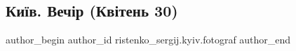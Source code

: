  
 
 
 
 

\subsection{Київ. Вечір (Квітень 30)}
\label{sec:30_04_2023.fb.ristenko_sergij.kyiv.fotograf.1.kyiv_vechir_kviten_30}

\ifcmt
 author_begin
   author_id ristenko_sergij.kyiv.fotograf
 author_end
\fi
